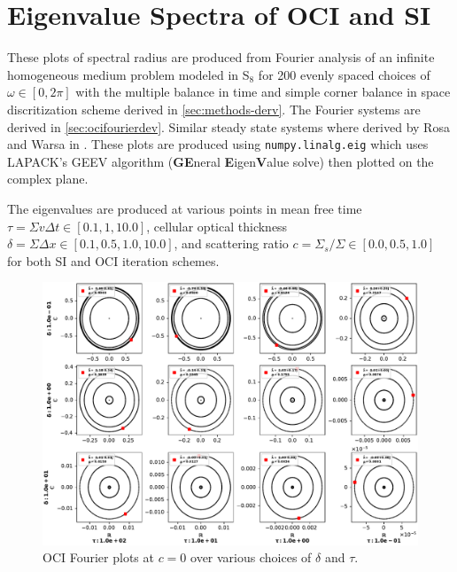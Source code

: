 

\chapter{Eigenvalue Spectra of OCI and SI}
\label{chap:spec_rads}

These plots of spectral radius are produced from Fourier analysis of an infinite homogeneous medium problem modeled in S$_8$ for \num{200} evenly spaced choices of $\omega \in [0,2\pi]$ with the multiple balance in time and simple corner balance in space discritization scheme derived in \ref{sec:methods-derv}.
The Fourier systems are derived in \ref{sec:ocifourierdev}.
Similar steady state systems where derived by Rosa and Warsa in \cite{rosa_cellwise_2013, tsa_2d2007rosa}.
These plots are produced using \texttt{numpy.linalg.eig} \cite{van_der_walt_numpy_2011} which uses LAPACK's GEEV algorithm (\textbf{GE}neral \textbf{E}igen\textbf{V}alue solve) \cite{laug} then plotted on the complex plane.

The eigenvalues are produced at various points in mean free time $\tau=\Sigma v\Delta t \in [0.1, 1, 10.0]$, cellular optical thickness $\delta=\Sigma\Delta x\in[0.1, 0.5, 1.0, 10.0]$, and scattering ratio $c = \Sigma_s/\Sigma \in [0.0, 0.5, 1.0]$ for both SI and OCI iteration schemes.


\begin{figure}
\begin{center}
	\includegraphics[width=\textwidth]{appendix/eig_plots/oci0.0.pdf}
	\caption{OCI Fourier plots at $c=0$ over various choices of $\delta$ and $\tau$.}
\end{center}
\end{figure}

